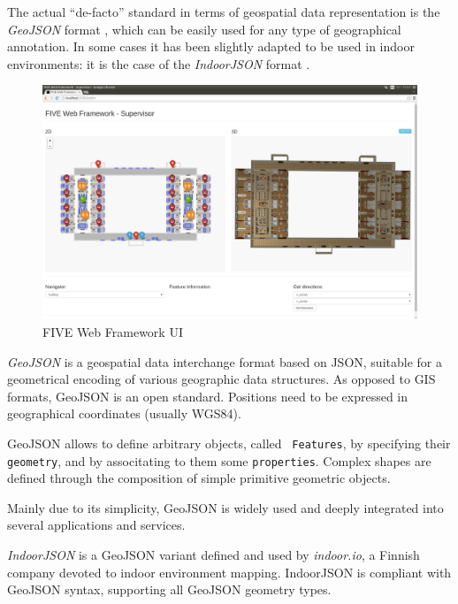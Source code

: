 The actual ``de-facto'' standard in terms of geospatial data representation is
the \emph{GeoJSON} format \cite{geojson}, which can be easily used for any type of geographical
annotation. In some cases it has been slightly adapted to be used in indoor
environments: it is the case of the \emph{IndoorJSON} format \cite{indoorjson}.



\begin{figure}[t!]
\centering
\includegraphics[width=\textwidth]{images/framework-ui.png}
\caption{FIVE Web Framework UI}
\label{fig:web-framework-ui}
\end{figure}




\emph{GeoJSON} is a geospatial data interchange format based on JSON, suitable for a
geometrical encoding of various geographic data structures. As opposed to GIS
formats, GeoJSON is an open standard. Positions need to be expressed in
geographical coordinates (usually WGS84).

GeoJSON \cite{geojson} allows to define arbitrary objects, called {\tt
Features}, by specifying their {\tt geometry}, and by associtating to them some
{\tt properties}. Complex shapes are defined through the composition of
simple primitive geometric objects. 

Mainly due to its simplicity,
GeoJSON is widely used and deeply integrated into several applications and
services.

\emph{IndoorJSON} \cite{indoorjson} is a GeoJSON variant defined and used by \emph{indoor.io}, a
Finnish company devoted to indoor environment mapping. IndoorJSON is compliant
with GeoJSON syntax, supporting all GeoJSON geometry types.

